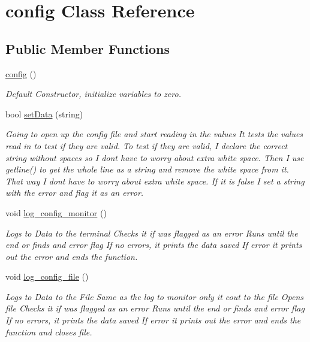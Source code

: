 \hypertarget{classconfig}{}\section{config Class Reference}
\label{classconfig}
\subsection*{Public Member Functions}
\begin{DoxyCompactItemize}
\item 
\mbox{\label{classconfig_ab1b245308f26ce7979e4c37e93869706}} 
\mbox{\hyperlink{classconfig_ab1b245308f26ce7979e4c37e93869706}{config}} ()
\begin{DoxyCompactList}\small\item\em Default Constructor, initialize variables to zero. \end{DoxyCompactList}\item 
bool \mbox{\hyperlink{classconfig_af2de59fd72d20777f086a19404740918}{set\+Data}} (string)
\begin{DoxyCompactList}\small\item\em Going to open up the config file and start reading in the values It tests the values read in to test if they are valid. To test if they are valid, I declare the correct string without spaces so I don\textquotesingle{}t have to worry about extra white space. Then I use getline() to get the whole line as a string and remove the white space from it. That way I don\textquotesingle{}t have to worry about extra white space. If it is false I set a string with the error and flag it as an error. \end{DoxyCompactList}\item 
void \mbox{\hyperlink{classconfig_a83e282187a1be39b49284568053b5064}{log\+\_\+config\+\_\+monitor}} ()
\begin{DoxyCompactList}\small\item\em Logs to Data to the terminal Checks it if was flagged as an error Runs until the end or finds and error flag If no errors, it prints the data saved If error it prints out the error and ends the function. \end{DoxyCompactList}\item 
void \mbox{\hyperlink{classconfig_af5a46d231093e078b6356897f8fece32}{log\+\_\+config\+\_\+file}} ()
\begin{DoxyCompactList}\small\item\em Logs to Data to the File Same as the log to monitor only it cout to the file Opens file Checks it if was flagged as an error Runs until the end or finds and error flag If no errors, it prints the data saved If error it prints out the error and ends the function and closes file. \end{DoxyCompactList}\item 

\end{DoxyCompactItemize}
